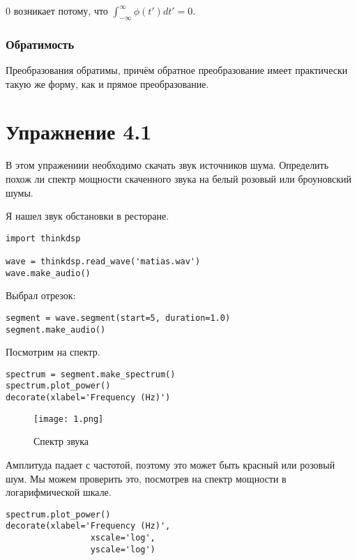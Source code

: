 \documentclass[a4paper,12pt]{report}
\begin{document}
0 возникает потому, что $\int_{-\infty}^{\infty} \phi(t') dt' = 0$.

\subsection{Обратимость}

Преобразования обратимы, причём обратное преобразование имеет практически такую же форму, как и прямое преобразование.

\chapter{Упражнение 4.1}
В этом упражениии необходимо скачать звук  источников шума. Определить похож ли спектр мощности скаченного звука на белый розовый или броуновский шумы.

Я нашел звук обстановки в ресторане.

\begin{lstlisting}[caption=Прослушивание скачанного шума]
import thinkdsp

wave = thinkdsp.read_wave('matias.wav')
wave.make_audio()
\end{lstlisting}

Выбрал отрезок:

\begin{lstlisting}[caption=Выбор короткого отрезка]
segment = wave.segment(start=5, duration=1.0)
segment.make_audio()
\end{lstlisting}

Посмотрим на спектр.

\begin{lstlisting}[caption=Спектр звука]
spectrum = segment.make_spectrum()
spectrum.plot_power()
decorate(xlabel='Frequency (Hz)')
\end{lstlisting}

\begin{figure}[H]
        \centering
        \texttt{[image: 1.png]}
        \caption{Спектр звука}
        \label{fig:lab4_fig1_1}
\end{figure}

Амплитуда падает с частотой, поэтому это может быть красный или розовый шум. Мы можем проверить это, посмотрев на спектр мощности в логарифмической шкале.

\begin{lstlisting}[caption=Спектр мощности звука]
spectrum.plot_power()
decorate(xlabel='Frequency (Hz)',
                 xscale='log', 
                 yscale='log')
\end{lstlisting}
\end{document}
